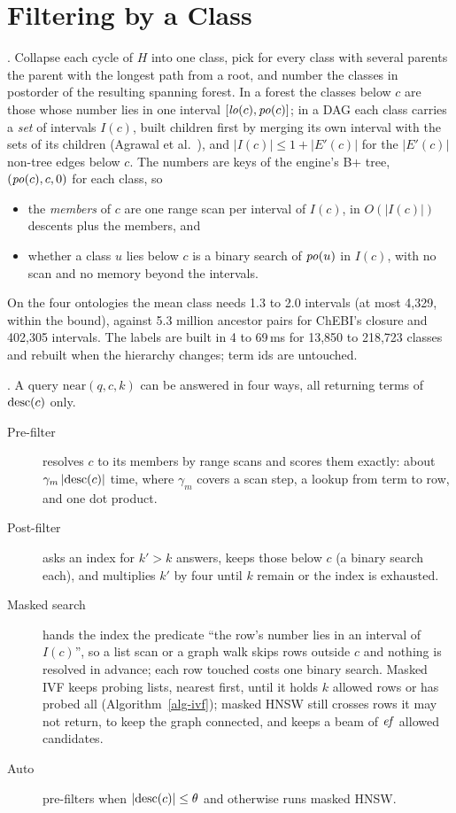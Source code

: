 \section{Filtering by a Class}
\label{sec-filter}

.
Collapse each cycle of $H$ into one class, pick for every class with several parents the
parent with the longest path from a root, and number the classes in postorder of the
resulting spanning forest.
In a forest the classes below $c$ are those whose number lies in one interval
$[\mathit{lo}(c),\mathit{po}(c)]$; in a DAG each class carries a \emph{set} of intervals $I(c)$, built
children first by merging its own interval with the sets of its children
(Agrawal et al.~\cite{agrawal1989}), and $|I(c)|\le 1+|E'(c)|$ for the $|E'(c)|$
non-tree edges below $c$.
The numbers are keys of the engine's B+ tree, $(\mathit{po}(c),c,0)$ for each class, so
\begin{itemize}
\item the \emph{members} of $c$ are one range scan per interval of $I(c)$, in
  $O(|I(c)|)$ descents plus the members, and
\item whether a class $u$ lies below $c$ is a binary search of $\mathit{po}(u)$ in $I(c)$, with
  no scan and no memory beyond the intervals.
\end{itemize}
On the four ontologies the mean class needs 1.3 to 2.0 intervals (at most 4,329, within the
bound), against 5.3 million ancestor pairs for ChEBI's closure and 402,305 intervals.
The labels are built in 4 to 69\,ms for 13,850 to 218,723 classes and rebuilt when the
hierarchy changes; term ids are untouched.

.
A query $\mathrm{near}(q,c,k)$ can be answered in four ways, all returning terms of
$\mathrm{desc}(c)$ only.
\begin{description}
\item[Pre-filter] resolves $c$ to its members by range scans and scores them exactly:
  about $\gamma_m\,|\mathrm{desc}(c)|$ time, where $\gamma_m$ covers a scan step, a lookup from
  term to row, and one dot product.
\item[Post-filter] asks an index for $k'>k$ answers, keeps those below $c$ (a binary
  search each), and multiplies $k'$ by four until $k$ remain or the index is exhausted.
\item[Masked search] hands the index the predicate ``the row's number lies in an
  interval of $I(c)$'', so a list scan or a graph walk skips rows outside $c$ and
  nothing is resolved in advance; each row touched costs one binary search.
  Masked IVF keeps probing lists, nearest first, until it holds $k$ allowed rows or
  has probed all (Algorithm~\ref{alg-ivf}); masked HNSW still crosses rows it may not
  return, to keep the graph connected, and keeps a beam of $\mathit{ef}$ allowed candidates.
\item[Auto] pre-filters when $|\mathrm{desc}(c)|\le\theta$ and otherwise runs masked HNSW.
\end{description}

